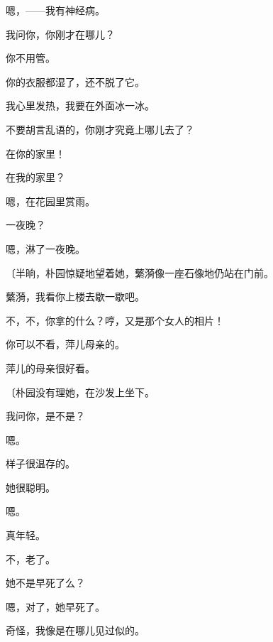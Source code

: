 嗯，——我有神经病。

我问你，你刚才在哪儿？

你不用管。

你的衣服都湿了，还不脱了它。

我心里发热，我要在外面冰一冰。

不要胡言乱语的，你刚才究竟上哪儿去了？

在你的家里！

在我的家里？

嗯，在花园里赏雨。

一夜晚？

嗯，淋了一夜晚。

{\fangsong〔半晌，朴园惊疑地望着她，蘩漪像一座石像地仍站在门前。}

蘩漪，我看你上楼去歇一歇吧。

不，不，你拿的什么？哼，又是那个女人的相片！

你可以不看，萍儿母亲的。

萍儿的母亲很好看。

{\fangsong〔朴园没有理她，在沙发上坐下。}

我问你，是不是？

嗯。

样子很温存的。


她很聪明。

嗯。

真年轻。

不，老了。

她不是早死了么？

嗯，对了，她早死了。

奇怪，我像是在哪儿见过似的。

